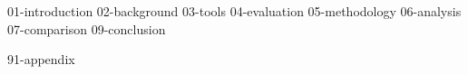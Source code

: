 \documentclass[a4paper,oneside,10pt,english]{scrbook}
\begin{document}


\mainmatter


{01-introduction}
{02-background}
{03-tools}
{04-evaluation}
{05-methodology}
{06-analysis}
{07-comparison}
{09-conclusion}


\cleardoubleoddpage
\printbibliography

\appendix


{91-appendix}


\cleardoubleoddpage
\end{document}
